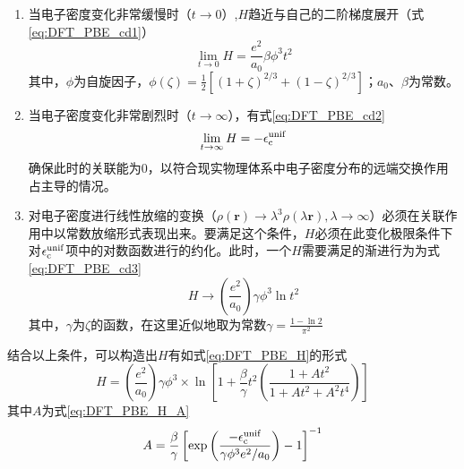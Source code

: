 \begin{enumerate}[labelsep=0em,label=（\arabic*）,wide]
    \item 当电子密度变化非常缓慢时（$t\rightarrow 0$）,$H$趋近与自己的二阶梯度展开（式\eqref{eq:DFT_PBE_cd1}）\chinesecolon
    \begin{equation}
        \label{eq:DFT_PBE_cd1}
        \lim_{t\rightarrow0}H=\frac{e^2}{a_{0}}\beta\phi^3t^2
        \end{equation}
    其中，$\phi$为自旋因子，$\phi\left(\zeta\right)=\frac{1}{2}\left[\left(1+\zeta\right)^{2/ 3}+\left(1-\zeta\right)^{2/ 3}\right]$；$a_{0}$、$\beta$为常数。
    \item 当电子密度变化非常剧烈时（$t\rightarrow \infty$），有式\eqref{eq:DFT_PBE_cd2}
    \begin{equation}
        \label{eq:DFT_PBE_cd2}
        \lim_{t\rightarrow\infty}H=-\epsilon_{\rm c}^{\rm unif}
    \end{equation}
    确保此时的关联能为0，以符合现实物理体系中电子密度分布的远端交换作用占主导的情况。
    \item 对电子密度进行线性放缩的变换（$\rho\left({\bm r}\right)\rightarrow \lambda^3\rho(\lambda {\bm r}), \lambda\rightarrow \infty$）必须在关联作用中以常数放缩形式表现出来。要满足这个条件，$H$必须在此变化极限条件下对$\epsilon_{\rm c}^{\rm unif}$项中的对数函数进行的约化。此时，一个$H$需要满足的渐进行为为式\eqref{eq:DFT_PBE_cd3}
    \begin{equation}
        \label{eq:DFT_PBE_cd3}
        H\rightarrow\left(\frac{e^2}{a_0}\right)\gamma\phi^3\ln t^2
    \end{equation}
    其中，$\gamma$为$\zeta$的函数，在这里近似地取为常数$\gamma=\frac{1-\ln2}{\pi^2}$
\end{enumerate}

    结合以上条件，可以构造出$H$有如式\eqref{eq:DFT_PBE_H}的形式\chinesecolon
    \begin{equation}
        \label{eq:DFT_PBE_H}
        H=\left(\frac{e^2}{a_0}\right)\gamma\phi^3\times \ln\left[1+\frac{\beta}{\gamma}t^2\left(\frac{1+At^2}{1+At^2+A^2t^4}\right)\right]
    \end{equation}
    其中$A$为式\eqref{eq:DFT_PBE_H_A}\chinesecolon
    \begin{equation}
        \label{eq:DFT_PBE_H_A}
        A=\frac{\beta}{\gamma}\left[\exp\left(\frac{-\epsilon_{\rm c}^{\rm unif}}{\gamma\phi^3e^2/ a_0}\right)-1\right]^{-1}
    \end{equation}

